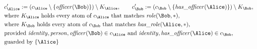 \begin{align*}
&
c'_
{
\Alice
}
 := 
(c_
{
\Alice
}
 \setminus 
\{
\mathit{\detokenize{
officer
}}
(
\Bob
)
\}
) \setminus K_
{
\Alice
}
, \qquad 
c'_
{
\Bob
}
 := 
(c_
{
\Bob
}
 \setminus 
\{
\mathit{\detokenize{
has_officer
}}
(
\Alice
)
\}
) \setminus K_
{
\Bob
}
,\\
&
\text{where } K_
{
\Alice
}
 \text{ holds every atom of } c_
{
\Alice
}
 \text{ that matches } 
\mathit{\detokenize{
role
}}
(
\Bob
,
\ast
)
,\\
&
\text{where } K_
{
\Bob
}
 \text{ holds every atom of } c_
{
\Bob
}
 \text{ that matches } 
\mathit{\detokenize{
has_role
}}
(
\Alice
,
\ast
)
,\\
&
\text{provided } 
\mathit{\detokenize{
identity
}}
,
\mathit{\detokenize{
person
}}
,
\mathit{\detokenize{
officer
}}
(
\Bob
)
 \in c_
{
\Alice
}
 \text{ and } 
\mathit{\detokenize{
identity
}}
,
\mathit{\detokenize{
has_officer
}}
(
\Alice
)
 \in c_
{
\Bob
}
,\\
&
\text{guarded by } \{
\Alice
\}
\end{align*}

